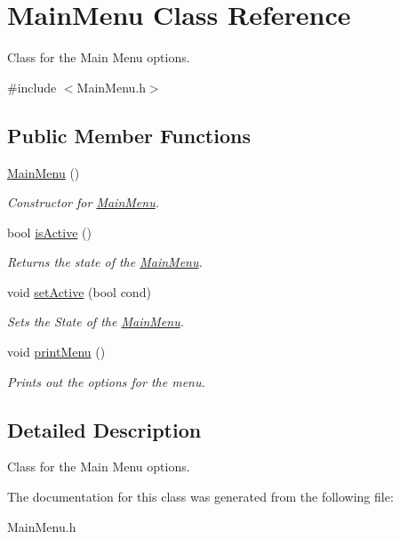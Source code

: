 \hypertarget{class_main_menu}{}\section{Main\+Menu Class Reference}
\label{class_main_menu}


Class for the Main Menu options.  




{\ttfamily \#include $<$Main\+Menu.\+h$>$}

\subsection*{Public Member Functions}
\begin{DoxyCompactItemize}
\item 
\hypertarget{class_main_menu_a53eecf9d5ffd094f54ac4193e7e57eaf}{}\hyperlink{class_main_menu_a53eecf9d5ffd094f54ac4193e7e57eaf}{Main\+Menu} ()\label{class_main_menu_a53eecf9d5ffd094f54ac4193e7e57eaf}

\begin{DoxyCompactList}\small\item\em Constructor for \hyperlink{class_main_menu}{Main\+Menu}. \end{DoxyCompactList}\item 
\hypertarget{class_main_menu_a4077c271488b4a8b23e9b604d2fed3fa}{}bool \hyperlink{class_main_menu_a4077c271488b4a8b23e9b604d2fed3fa}{is\+Active} ()\label{class_main_menu_a4077c271488b4a8b23e9b604d2fed3fa}

\begin{DoxyCompactList}\small\item\em Returns the state of the \hyperlink{class_main_menu}{Main\+Menu}. \end{DoxyCompactList}\item 
\hypertarget{class_main_menu_aaa5552fac90730aefdff50e6da9b7a23}{}void \hyperlink{class_main_menu_aaa5552fac90730aefdff50e6da9b7a23}{set\+Active} (bool cond)\label{class_main_menu_aaa5552fac90730aefdff50e6da9b7a23}

\begin{DoxyCompactList}\small\item\em Sets the State of the \hyperlink{class_main_menu}{Main\+Menu}. \end{DoxyCompactList}\item 
\hypertarget{class_main_menu_a1b9b41ad0279109a750af16c945d43b9}{}void \hyperlink{class_main_menu_a1b9b41ad0279109a750af16c945d43b9}{print\+Menu} ()\label{class_main_menu_a1b9b41ad0279109a750af16c945d43b9}

\begin{DoxyCompactList}\small\item\em Prints out the options for the menu. \end{DoxyCompactList}\end{DoxyCompactItemize}


\subsection{Detailed Description}
Class for the Main Menu options. 

The documentation for this class was generated from the following file\+:\begin{DoxyCompactItemize}
\item 
Main\+Menu.\+h\end{DoxyCompactItemize}
